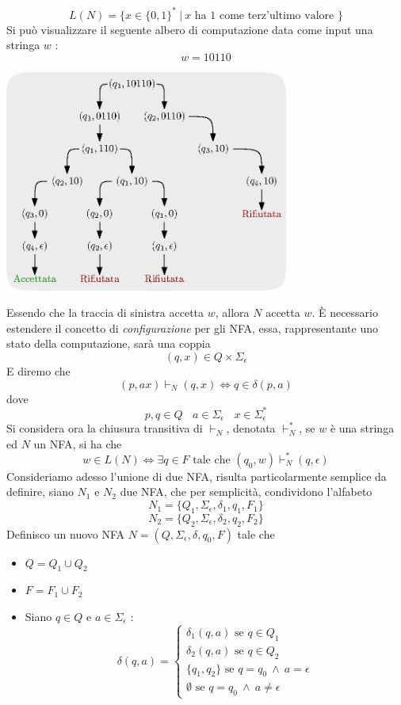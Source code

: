 \documentclass[10pt, letterpaper]{report}
\begin{document}
$$ L(N)=\{x\in\{0,1\}^*\ | \ x\text{ ha $1$ come terz'ultimo valore }\}$$
Si può visualizzare il seguente albero di computazione data come input una stringa $w$ :
$$w=10110$$\begin{center}
    \includegraphics[width=0.7\textwidth ]{images/alberoCalc.eps}
\end{center}
Essendo che la traccia di sinistra accetta $w$, allora $N$ accetta $w$.\acc 
È necessario estendere il concetto di \textit{configurazione} per gli NFA, essa, rappresentante 
uno stato della computazione, sarà una coppia 
$$ (q,x)\in Q\times \Sigma_\epsilon$$
E diremo che 
$$ (p,ax)\vdash_N (q,x)\iff q\in \delta(p,a)$$
dove 
$$p,q\in Q \ \ \ \ a\in \Sigma_\epsilon\ \ \ \ x\in \Sigma_\epsilon^*$$
Si considera ora la chiusura transitiva di $\vdash_N$, denotata $\vdash_N^*$, se $w$ è una stringa ed 
$N$ un NFA, si ha che 
$$ w\in L(N)\iff \exists q\in F\text{ tale che } (q_0,w)\vdash_N^* (q,\epsilon)$$
Consideriamo adesso l'unione di due NFA, risulta particolarmente semplice da definire, siano $N_1$ e $N_2$ due 
NFA, che per semplicità, condividono l'alfabeto 
$$ 
N_1=\{Q_1,\Sigma_\epsilon,\delta_1,q_1,F_1\}
$$$$ 
N_2=\{Q_2,\Sigma_\epsilon,\delta_2,q_2,F_2\}
$$
Definisco un nuovo NFA $N=(Q,\Sigma_\epsilon,\delta,q_0,F)$ tale che \begin{itemize}
    \item $Q=Q_1\cup Q_2$
    \item $F=F_1\cup F_2$
    \item Siano $q\in Q$ e $a\in\Sigma_\epsilon$ : 
    $$ 
        \delta(q,a)=\begin{cases}
            \delta_1(q,a) \text{ se }q\in Q_1\\
            \delta_2(q,a) \text{ se }q\in Q_2\\
            \{q_1,q_2\} \text{ se }q=q_0  \ \land\ a=\epsilon \\
            \emptyset \text{ se }q=q_0\ \land \ a\ne \epsilon 
        \end{cases}
    $$
\end{itemize}
\end{document}
